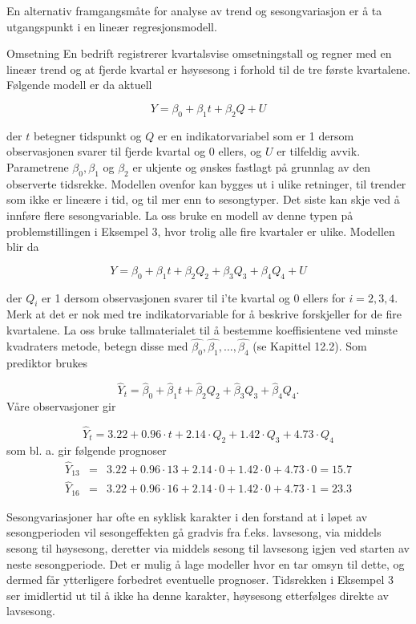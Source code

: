 En alternativ framgangsmåte for analyse av trend og sesongvariasjon er 
å ta utgangspunkt i en lineær regresjonsmodell.\\


\begin{eksempel}{Omsetning}
En bedrift registrerer kvartalsvise omsetningstall og regner med en lineær
trend og at fjerde kvartal er høysesong i forhold til de tre første 
kvartalene.  Følgende modell er da aktuell

\[  Y={\beta}_0+{\beta}_1 t + {\beta}_2 Q + U \]

\noindent der $t$ betegner tidspunkt og $Q$ er en indikatorvariabel som er 1
dersom observasjonen svarer til fjerde kvartal og $0$ ellers, og $U$ er
tilfeldig avvik.  Parametrene ${\beta}_0, {\beta}_1$ og ${\beta}_2$ er ukjente
og ønskes fastlagt på grunnlag av den observerte tidsrekke.  Modellen 
ovenfor kan bygges ut i ulike retninger, til trender som ikke er lineære i
tid, og til mer enn to sesongtyper.  Det siste kan skje ved å innføre
flere sesongvariable.  La oss bruke en modell av denne typen på 
problemstillingen i Eksempel 3, hvor trolig alle fire kvartaler er ulike.
Modellen blir da

\[ Y={\beta}_0+{\beta}_1 t + {\beta}_2 Q_2 + {\beta}_3 Q_3
                            + {\beta}_4 Q_4 + U \]

\noindent der $Q_i$ er 1 dersom observasjonen svarer til i'te kvartal og 0
ellers for $i = 2, 3, 4$. Merk at det er nok med tre indikatorvariable for
å beskrive forskjeller for de fire kvartalene.  La oss bruke tallmaterialet
til å bestemme koeffisientene ved minste kvadraters metode, betegn
disse med $\hat{{\beta}_0}, \hat{{\beta}_1}, \ldots, \hat{{\beta}_4}$ (se
Kapittel 12.2).  Som prediktor brukes 

\[  {\hat{Y}}_t={\hat{\beta}}_0+{\hat{\beta}}_1 t + {\hat{\beta}}_2 Q_2
                            + {\hat{\beta}}_3 Q_3 + {\hat{\beta}}_4 Q_4 . \]
\noindent Våre observasjoner gir

\[ {\hat{Y}}_t=3.22+0.96\cdot t + 2.14 \cdot Q_2 + 1.42 \cdot Q_3
                                                 + 4.73 \cdot Q_4   \]
\noindent som bl. a. gir følgende prognoser
\begin{eqnarray*}
 {\hat{Y}}_{13}&=&3.22+0.96\cdot 13 + 2.14 \cdot 0 + 1.42 \cdot 0 
                                                 + 4.73 \cdot 0 = 15.7 \\
 {\hat{Y}}_{16}&=&3.22+0.96\cdot 16 + 2.14 \cdot 0 + 1.42 \cdot 0 
                                                 + 4.73 \cdot 1 = 23.3
\end{eqnarray*}
\end{eksempel}
Sesongvariasjoner har ofte en syklisk karakter i den forstand at i løpet
av sesongperioden vil sesongeffekten gå gradvis fra f.eks. lavsesong,
via middels sesong til høysesong, deretter via middels sesong til 
lavsesong igjen ved starten av neste sesongperiode.  Det er mulig å lage
modeller hvor en tar omsyn til dette, og dermed får ytterligere forbedret
eventuelle prognoser.  Tidsrekken i Eksempel 3 ser imidlertid ut til å
ikke ha denne karakter, høysesong etterfølges direkte av lavsesong.

